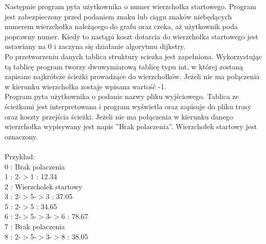 \documentclass[12pt,a4paper]{article}
\begin{document}
Następnie program pyta użytkownika o numer wierzchołka startowego. Program jest zabezpieczony przed podaniem znaku lub ciągu znaków niebędących numerem wierzchołka należącego do grafu oraz czeka, aż użytkownik poda poprawny numer. Kiedy to nastąpi koszt dotarcia do wierzchołka startowego jest ustawiany na 0 i zaczyna się działanie algorytmu dijkstry.\\

 Po przetworzeniu danych tablica struktury sciezka jest zapełniona. Wykorzystując tą tablicę program tworzy dwuwymiarową tablicę typu int, w której zostaną zapisane najkrótsze ścieżki prowadzące do wierzchołków. Jeżeli nie ma połączenia w kierunku wierzchołka zostaje wpisana wartość -1.\\

Program pyta użytkownika o podanie nazwy pliku wyjściowego. Tablica ze ścieżkami jest interpretowana i program wyświetla oraz zapisuje do pliku trasy oraz koszty przejścia ścieżki. Jeżeli nie ma połączenia w kierunku danego wierzchołka wypisywany jest napis ”Brak polaczenia”. Wierzchołek startowy jest oznaczony.\\ \\
 Przykład: \\
0 : Brak polaczenia\\
1 : 2-$>$1 : 12.34 \\
2 : Wierzcholek startowy\\
3 : 2-$>$5-$>$3 : 37.05 \\
5 : 2-$>$5 : 34.65 \\
6 : 2-$>$5-$>$3-$>$6 : 78.67\\
7 : Brak polaczenia\\
8 : 2-$>$5-$>$3-$>$8 : 38.05 \\
\end{document}
